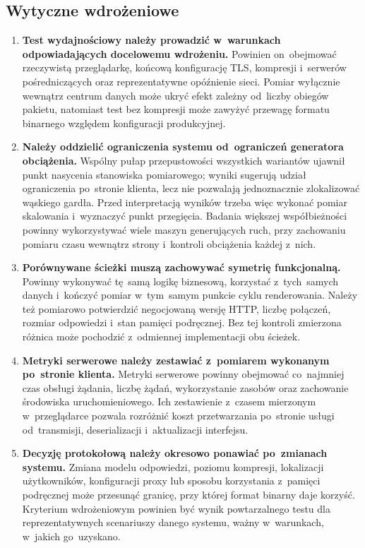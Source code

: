 \subsection{Wytyczne wdrożeniowe}

\begin{enumerate}
    \item \textbf{Test wydajnościowy należy prowadzić w~warunkach odpowiadających docelowemu wdrożeniu.} Powinien on~obejmować rzeczywistą przeglądarkę, końcową konfigurację TLS, kompresji i~serwerów pośredniczących oraz reprezentatywne opóźnienie sieci. Pomiar wyłącznie wewnątrz centrum danych może ukryć efekt zależny od~liczby obiegów pakietu, natomiast test bez kompresji może zawyżyć przewagę formatu binarnego względem konfiguracji produkcyjnej.

    \item \textbf{Należy oddzielić ograniczenia systemu od~ograniczeń generatora obciążenia.} Wspólny pułap przepustowości wszystkich wariantów ujawnił punkt nasycenia stanowiska pomiarowego; wyniki sugerują udział ograniczenia po~stronie klienta, lecz nie pozwalają jednoznacznie zlokalizować wąskiego gardła. Przed interpretacją wyników trzeba więc wykonać pomiar skalowania i~wyznaczyć punkt przegięcia. Badania większej współbieżności powinny wykorzystywać wiele maszyn generujących ruch, przy zachowaniu pomiaru czasu wewnątrz strony i~kontroli obciążenia każdej z~nich.

    \item \textbf{Porównywane ścieżki muszą zachowywać symetrię funkcjonalną.} Powinny wykonywać tę~samą logikę biznesową, korzystać z~tych~samych danych i~kończyć pomiar w~tym~samym punkcie cyklu renderowania. Należy też pomiarowo potwierdzić negocjowaną wersję HTTP, liczbę połączeń, rozmiar odpowiedzi i~stan pamięci podręcznej. Bez tej kontroli zmierzona różnica może pochodzić z~odmiennej implementacji obu ścieżek.

    \item \textbf{Metryki serwerowe należy zestawiać z~pomiarem wykonanym po~stronie klienta.} Metryki serwerowe powinny obejmować co~najmniej czas obsługi żądania, liczbę żądań, wykorzystanie zasobów oraz zachowanie środowiska uruchomieniowego. Ich zestawienie z~czasem mierzonym w~przeglądarce pozwala rozróżnić koszt przetwarzania po~stronie usługi od~transmisji, deserializacji i~aktualizacji interfejsu.

    \item \textbf{Decyzję protokołową należy okresowo ponawiać po~zmianach systemu.} Zmiana modelu odpowiedzi, poziomu kompresji, lokalizacji użytkowników, konfiguracji proxy lub sposobu korzystania z~pamięci podręcznej może przesunąć granicę, przy której format binarny daje korzyść. Kryterium wdrożeniowym powinien być wynik powtarzalnego testu dla reprezentatywnych scenariuszy danego systemu, ważny w~warunkach, w~jakich go~uzyskano.
\end{enumerate}
